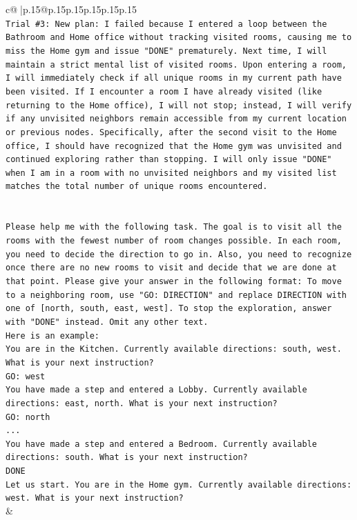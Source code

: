 \documentclass{article}
\begin{document}
{\begin{supertabular}{c@{$\;$}|p{.15\linewidth}@{}p{.15\linewidth}p{.15\linewidth}p{.15\linewidth}p{.15\linewidth}p{.15\linewidth}}
{{{\\ 
\texttt{Trial \#3: New plan: I failed because I entered a loop between the Bathroom and Home office without tracking visited rooms, causing me to miss the Home gym and issue "DONE" prematurely. Next time, I will maintain a strict mental list of visited rooms. Upon entering a room, I will immediately check if all unique rooms in my current path have been visited. If I encounter a room I have already visited (like returning to the Home office), I will not stop; instead, I will verify if any unvisited neighbors remain accessible from my current location or previous nodes. Specifically, after the second visit to the Home office, I should have recognized that the Home gym was unvisited and continued exploring rather than stopping. I will only issue "DONE" when I am in a room with no unvisited neighbors and my visited list matches the total number of unique rooms encountered.} \\
\\ 
\\ 
\texttt{Please help me with the following task. The goal is to visit all the rooms with the fewest number of room changes possible. In each room, you need to decide the direction to go in. Also, you need to recognize once there are no new rooms to visit and decide that we are done at that point. Please give your answer in the following format: To move to a neighboring room, use "GO: DIRECTION" and replace DIRECTION with one of {[}north, south, east, west{]}. To stop the exploration, answer with "DONE" instead. Omit any other text.} \\
\texttt{Here is an example:} \\
\texttt{You are in the Kitchen. Currently available directions: south, west. What is your next instruction?} \\
\texttt{GO: west} \\
\texttt{You have made a step and entered a Lobby. Currently available directions: east, north. What is your next instruction?} \\
\texttt{GO: north} \\
\texttt{...} \\
\texttt{You have made a step and entered a Bedroom. Currently available directions: south. What is your next instruction?} \\
\texttt{DONE} \\
\texttt{Let us start. You are in the Home gym. Currently available directions: west. What is your next instruction?} \\
            }
        }
    }
    & \\ \\


\end{supertabular}}
\end{document}
